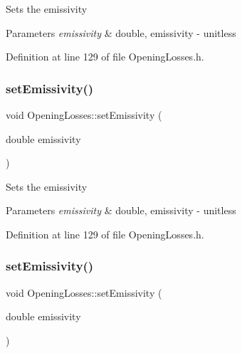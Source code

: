 Sets the emissivity 
\begin{DoxyParams}{Parameters}
{\em emissivity} & double, emissivity -\/ unitless \\
\hline
\end{DoxyParams}


Definition at line 129 of file Opening\+Losses.\+h.

\mbox{\label{class_opening_losses_aa63eb1c2ba9057d401f3a7f5dd974afe}} 
\subsubsection{\texorpdfstring{set\+Emissivity()}{setEmissivity()}\hspace{0.1cm}{\footnotesize\ttfamily [2/3]}}
{\footnotesize\ttfamily void Opening\+Losses\+::set\+Emissivity (\begin{DoxyParamCaption}\item[{double}]{emissivity }\end{DoxyParamCaption})\hspace{0.3cm}{\ttfamily [inline]}}

Sets the emissivity 
\begin{DoxyParams}{Parameters}
{\em emissivity} & double, emissivity -\/ unitless \\
\hline
\end{DoxyParams}


Definition at line 129 of file Opening\+Losses.\+h.

\mbox{\label{class_opening_losses_aa63eb1c2ba9057d401f3a7f5dd974afe}} 
\subsubsection{\texorpdfstring{set\+Emissivity()}{setEmissivity()}\hspace{0.1cm}{\footnotesize\ttfamily [3/3]}}
{\footnotesize\ttfamily void Opening\+Losses\+::set\+Emissivity (\begin{DoxyParamCaption}\item[{double}]{emissivity }\end{DoxyParamCaption})\hspace{0.3cm}{\ttfamily [inline]}}

